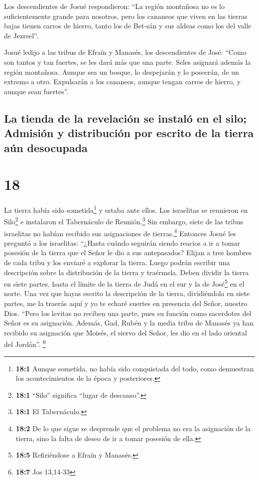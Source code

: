  Los descendientes de Josué respondieron: ``La región
montañosa no es lo suficientemente grande para nosotros, pero los
cananeos que viven en las tierras bajas tienen carros de hierro, tanto
los de Bet-sán y sus aldeas como los del valle de Jezreel''.

 Josué ledijo a las tribus de Efraín y Manasés, los
descendientes de José: ``Como son tantos y tan fuertes, se les dará más
que una parte.  Seles asignará además la región
montañosa. Aunque sea un bosque, lo despejarán y lo poseerán, de un
extremo a otro. Expulsarán a los cananeos, aunque tengan carros de
hierro, y aunque sean fuertes''.

\hypertarget{la-tienda-de-la-revelaciuxf3n-se-instaluxf3-en-el-silo-admisiuxf3n-y-distribuciuxf3n-por-escrito-de-la-tierra-auxfan-desocupada}{%
\subsection{La tienda de la revelación se instaló en el silo; Admisión y
distribución por escrito de la tierra aún
desocupada}\label{la-tienda-de-la-revelaciuxf3n-se-instaluxf3-en-el-silo-admisiuxf3n-y-distribuciuxf3n-por-escrito-de-la-tierra-auxfan-desocupada}}

\hypertarget{section-17}{%
\section{18}\label{section-17}}

 La tierra había sido sometida\footnote{\textbf{18:1}
  Aunque sometida, no había sido conquistada del todo, como demuestran
  los acontecimientos de la época y posteriores.} y estaba ante ellos.
Los israelitas se reunieron en Silo\footnote{\textbf{18:1} ``Silo''
  significa ``lugar de descanso''.} e instalaron el Tabernáculo de
Reunión.\footnote{\textbf{18:1} El Tabernáculo.}  Sin
embargo, siete de las tribus israelitas no habían recibido sus
asignaciones de tierras.\footnote{\textbf{18:2} De lo que sigue se
  desprende que el problema no era la asignación de la tierra, sino la
  falta de deseo de ir a tomar posesión de ella.} 
Entonces Josué les preguntó a los israelitas: ``¿Hasta cuándo seguirán
siendo reacios a ir a tomar posesión de la tierra que el Señor le dio a
sus antepasados?  Elijan a tres hombres de cada tribu y
los enviaré a explorar la tierra. Luego podrán escribir una descripción
sobre la distribución de la tierra y traérmela.  Deben
dividir la tierra en siete partes, hasta el límite de la tierra de Judá
en el sur y la de José\footnote{\textbf{18:5} Refiriéndose a Efraín y
  Manasés.} en el norte.  Una vez que hayas escrito la
descripción de la tierra, dividiéndola en siete partes, me la traerás
aquí y yo te echaré suertes en presencia del Señor, nuestro Dios.
 ``Pero los levitas no reciben una parte, pues su función
como sacerdotes del Señor es su asignación. Además, Gad, Rubén y la
media tribu de Manasés ya han recibido su asignación que Moisés, el
siervo del Señor, les dio en el lado oriental del Jordán''. \footnote{\textbf{18:7}
  Jos 13,14-33}


